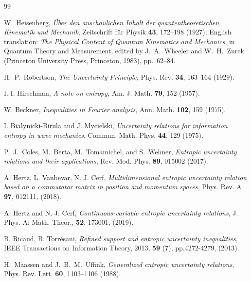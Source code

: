 \documentclass[aps,pra,onecolumn,nofootinbib,superscriptaddress,showpacs]{revtex4}
\begin{document}


\begin{thebibliography}{99}

W.~Heisenberg,
\emph{{\"U}ber den anschaulichen Inhalt der quantentheoretischen
Kinematik und Mechanik},
Zeitschrift f{\"u}r Physik
\textbf{43}, 172--198 (1927);
English translation:
\emph{The Physical Content of Quantum Kinematics and Mechanics},
in Quantum Theory and Measurement,
edited by J.~A.~Wheeler and W.~H.~Zurek
(Princeton University Press, Princeton, 1983),
pp.~62--84.


H.~P.~Robertson,
\emph{The Uncertainty Principle},
Phys. Rev.
\textbf{34}, 163--164 (1929).

I. I. Hirschman,
\emph{A note on entropy},
Am. J. Math. \textbf{79}, 152 (1957).

W. Beckner,
\emph{Inequalities in Fourier analysis},
Ann. Math. \textbf{102}, 159 (1975).

I. Białynicki-Birula and J. Mycielski,
\emph{Uncertainty relations for information entropy in wave mechanics},
Commun. Math. Phys. \textbf{44}, 129 (1975).

P.~J.~Coles, M.~Berta, M.~Tomamichel, and S.~Wehner,
\emph{Entropic uncertainty relations and their applications},
Rev. Mod. Phys.
\textbf{89}, 015002 (2017).

A. Hertz, L. Vanbevar, N. J. Cerf,
\emph{Multidimensional entropic uncertainty relation based on a commutator matrix
in position and momentum spaces},
Phys. Rev. A
\textbf{97}, 012111, (2018).

A. Hertz and N. J. Cerf,
\emph{Continuous-variable entropic uncertainty relations},
J. Phys. A: Math. Theor.,
\textbf{52}, 173001, (2019).
  
 
B. Ricaud, B. Torrésani, \emph{Refined support and entropic uncertainty inequalities}, IEEE Transactions
on Information Theory, 2013, \textbf{59} (7), pp.4272-4279, (2013).


H.~Maassen and J.~B.~M.~Uffink,
\emph{Generalized entropic uncertainty relations},
Phys. Rev. Lett.
\textbf{60}, 1103--1106 (1988).


\end{thebibliography}
\end{document}
